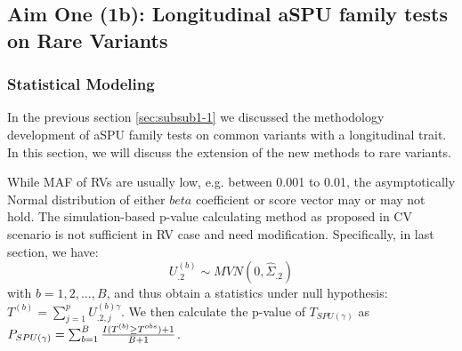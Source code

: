 \documentclass[12pt]{article}
\begin{document}








\subsection{Aim One (1b): Longitudinal aSPU family tests on Rare Variants}\label{sec:subsec2}
\subsubsection{Statistical Modeling}\label{sec:subsub2-1}
In the previous section \ref{sec:subsub1-1} we discussed the methodology development of aSPU family tests on common variants with a longitudinal trait. In this section, we will discuss the extension of the new methods to rare variants.

While MAF of RVs are usually low, e.g. between 0.001 to 0.01, the asymptotically Normal distribution of either $beta$ coefficient or score vector may or may not hold. The simulation-based p-value calculating method as proposed in CV scenario is not sufficient in RV case and need modification. Specifically, in last section, we have:
$$
U_{.2}^{ (b) } \sim MVN \left( 0, \hat{\Sigma}_{.2} \right)
$$
with $b = 1,2,\ldots,B$, and thus obtain a statistics under null hypothesis: $T ^ {(b)} = \sum_{j=1}^p U^{ (b)\gamma }_{.2, j} $. We then calculate the p-value of $T_{ SPU(\gamma) }$ as $P_{ SPU(\gamma) } = \sum_{b=1}^B { I(T^{(b)} \geq T ^ {obs} ) + 1  \over B + 1 } $. 
\end{document}
